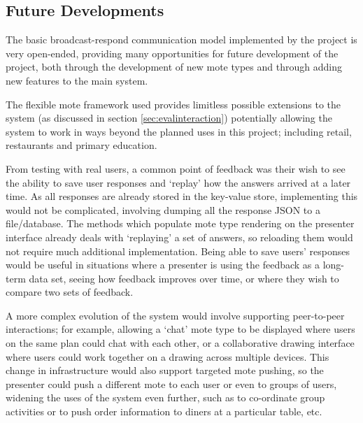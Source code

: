 \documentclass[a4papert,11pt,notitlepage]{article}
\begin{document}
\subsection{Future Developments}
The basic broadcast-respond communication model implemented by the project is very open-ended, providing many opportunities for future development of the project, both through the development of new mote types and through adding new features to the main system.

The flexible mote framework used provides limitless possible extensions to the system (as discussed in section \ref{sec:evalinteraction}) potentially allowing the system to work in ways beyond the planned uses in this project; including retail, restaurants and primary education.

From testing with real users, a common point of feedback was their wish to see the ability to save user responses and `replay' how the answers arrived at a later time. As all responses are already stored in the key-value store, implementing this would not be complicated, involving dumping all the response JSON to a file/database. The methods which populate mote type rendering on the presenter interface already deals with `replaying' a set of answers, so reloading them would not require much additional implementation. Being able to save users' responses would be useful in situations where a presenter is using the feedback as a long-term data set, seeing how feedback improves over time, or where they wish to compare two sets of feedback.

A more complex evolution of the system would involve supporting peer-to-peer interactions; for example, allowing a `chat' mote type to be displayed where users on the same plan could chat with each other, or a collaborative drawing interface where users could work together on a drawing across multiple devices. This change in infrastructure would also support targeted mote pushing, so the presenter could push a different mote to each user or even to groups of users, widening the uses of the system even further, such as to co-ordinate group activities or to push order information to diners at a particular table, etc.
\end{document}
